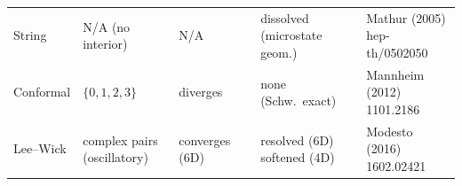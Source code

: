 \begin{table}[p]
\begin{adjustbox}{max width=\textwidth}
\begin{tabular}{@{} l l l l l @{}}
String
  & N/A (no interior)
  & N/A
  & \makecell[l]{dissolved\\(microstate geom.)}
  & \makecell[l]{Mathur (2005)\\{\scriptsize hep-th/0502050}}\\

Conformal
  & $\{0, 1, 2, 3\}$
  & diverges
  & none (Schw.\ exact)
  & \makecell[l]{Mannheim (2012)\\{\scriptsize 1101.2186}}\\

Lee--Wick
  & \makecell[l]{complex pairs\\(oscillatory)}
  & converges (6D)
  & \makecell[l]{resolved (6D)\\softened (4D)}
  & \makecell[l]{Modesto (2016)\\{\scriptsize 1602.02421}}\\

\bottomrule
\end{tabular}
\end{adjustbox}
\end{table}



